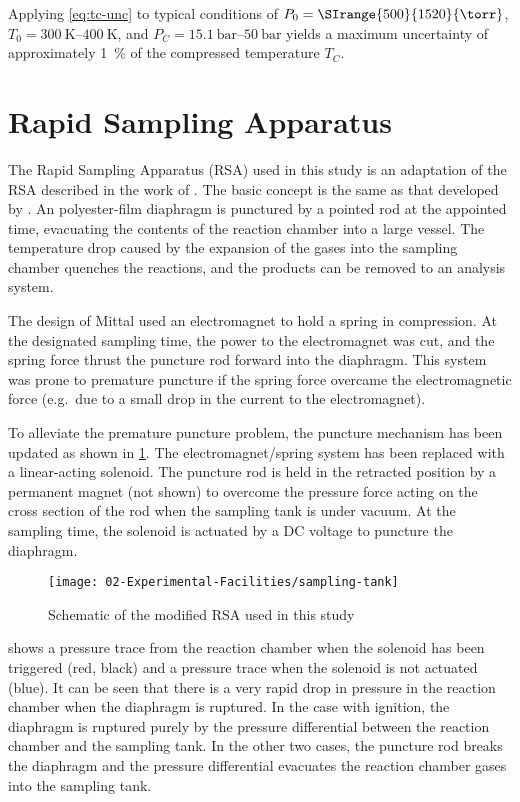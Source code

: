 \documentclass[../main.tex]{subfiles}
\begin{document}
Applying \cref{eq:tc-unc} to typical conditions of $P_0 = \SIrange{500}{1520}{\torr}$,
$T_0=\SIrange{300}{400}{\kelvin}$, and $P_C=\SIrange{15.1}{50}{\bar}$ yields
a maximum uncertainty of approximately \SI{1}{\percent} of the
compressed temperature $T_C$.

\section{Rapid Sampling Apparatus}
\label{sec:rsa}

The Rapid Sampling Apparatus (RSA) used in this study is an adaptation
of the RSA described in the work of \textcite{Mittal2007, Mittal2006a}.
The basic concept is the same as that developed by \textcite{Roblee1961}.
An polyester-film diaphragm is punctured by a pointed rod at the appointed time,
evacuating the contents of the reaction chamber into a large vessel. The
temperature drop caused by the expansion of the gases into the sampling
chamber quenches the reactions, and the products can be removed to an
analysis system.

The design of Mittal \cite{Mittal2007, Mittal2006a} used an electromagnet
to hold a spring in compression. At the designated sampling time, the
power to the electromagnet was cut, and the spring force thrust the
puncture rod forward into the diaphragm. This system was prone to
premature puncture if the spring force overcame the electromagnetic
force (e.g.\ due to a small drop in the current to the electromagnet).

To alleviate the premature puncture problem, the puncture mechanism has
been updated as shown in \cref{fig:sampling-tank}. The
electromagnet/spring system has been replaced with a linear-acting
solenoid. The puncture rod is held in the retracted position by a
permanent magnet (not shown) to overcome the pressure force acting on
the cross section of the rod when the sampling tank is under
vacuum. At the sampling time, the solenoid is actuated by a DC voltage
to puncture the diaphragm.

\begin{figure}
\texttt{[image: 02-Experimental-Facilities/sampling-tank]}
\caption{Schematic of the modified RSA used in this study}
\label{fig:sampling-tank}
\end{figure}

 shows a pressure trace from the reaction chamber
when the solenoid has been triggered (red, black) and a pressure trace when the
solenoid is not actuated (blue). It can be seen that there is a very rapid drop
in pressure in the reaction chamber when the diaphragm is ruptured. In the case
with ignition, the diaphragm is ruptured purely by the pressure differential
between the reaction chamber and the sampling tank. In the other two cases,
the puncture rod breaks the diaphragm and the pressure differential evacuates
the reaction chamber gases into the sampling tank.
\end{document}
